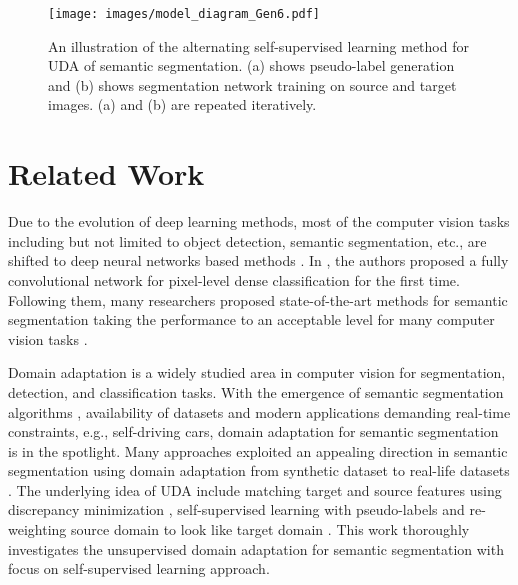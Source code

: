 \documentclass[10pt,twocolumn,letterpaper]{article}
\begin{document}
 















\begin{figure*}[t]
 	\centering
 	\texttt{[image: images/model\_diagram\_Gen6.pdf]}
 	\caption{An illustration of the alternating self-supervised learning method for UDA of semantic segmentation. (a) shows pseudo-label generation and (b) shows segmentation network training on source and target images. (a) and (b) are repeated iteratively.}
 	\label{img:1}
\vspace{-0.5cm}
\end{figure*}





\section{Related Work}
\label{sec:relatedWork}

Due to the evolution of deep learning methods, most of the computer vision tasks including but not limited to object detection, semantic segmentation, etc., are shifted to deep neural networks based methods \cite{chen2018domain}.
In \cite{long2015fully}, the authors proposed a fully convolutional network for pixel-level dense classification for the first time. Following them, many researchers proposed state-of-the-art methods for semantic segmentation taking the performance to an acceptable level for many computer vision tasks \cite{badrinarayanan2015segnet, chen2018deeplab, zhao2017pyramid}. 

Domain adaptation is a widely studied area in computer vision for segmentation, detection, and classification tasks. With the emergence of semantic segmentation algorithms \cite{badrinarayanan2015segnet, long2015fully, chen2014semantic}, availability of datasets \cite{Cordts2016Cityscapes, Ros_2016_CVPR, Richter_2016_ECCV} and modern applications demanding real-time constraints, e.g., self-driving cars, domain adaptation for semantic segmentation is in the spotlight. Many approaches exploited an appealing direction in semantic segmentation using domain adaptation from synthetic dataset to real-life datasets \cite{tsai2018learning, chen2017road}. 
The underlying idea of UDA include matching target and source features using discrepancy minimization \cite{zhang2018fully, mancini2018boosting}, self-supervised learning with pseudo-labels \cite{zou2018unsupervised, tri2018fully} and re-weighting source domain to look like target domain \cite{sankaranarayanan2018learning, hoffman2017cycada}. This work thoroughly investigates the unsupervised domain adaptation for semantic segmentation with focus on self-supervised learning approach. 
\end{document}
